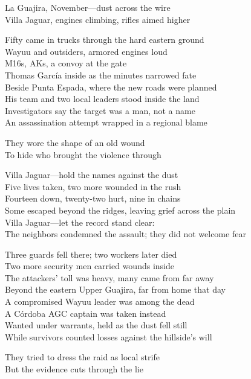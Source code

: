 \begin{lyrics}
La Guajira, November—dust across the wire\\
Villa Jaguar, engines climbing, rifles aimed higher

Fifty came in trucks through the hard eastern ground\\
Wayuu and outsiders, armored engines loud\\
M16s, AKs, a convoy at the gate\\
Thomas García inside as the minutes narrowed fate\\
Beside Punta Espada, where the new roads were planned\\
His team and two local leaders stood inside the land\\
Investigators say the target was a man, not a name\\
An assassination attempt wrapped in a regional blame

They wore the shape of an old wound\\
To hide who brought the violence through

Villa Jaguar—hold the names against the dust\\
Five lives taken, two more wounded in the rush\\
Fourteen down, twenty-two hurt, nine in chains\\
Some escaped beyond the ridges, leaving grief across the plain\\
Villa Jaguar—let the record stand clear:\\
The neighbors condemned the assault; they did not welcome fear

Three guards fell there; two workers later died\\
Two more security men carried wounds inside\\
The attackers’ toll was heavy, many came from far away\\
Beyond the eastern Upper Guajira, far from home that day\\
A compromised Wayuu leader was among the dead\\
A Córdoba AGC captain was taken instead\\
Wanted under warrants, held as the dust fell still\\
While survivors counted losses against the hillside’s will

They tried to dress the raid as local strife\\
But the evidence cuts through the lie


\end{lyrics}
